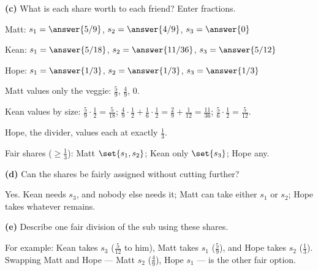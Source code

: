 \documentclass[12pt]{ximera}
\begin{document}
\begin{problem}
\begin{prompt}
\textbf{(c)} What is each share worth to each friend? Enter fractions.

Matt: $s_1=\answer{5/9}$, $s_2=\answer{4/9}$, $s_3=\answer{0}$

\smallskip
Kean: $s_1=\answer{5/18}$, $s_2=\answer{11/36}$, $s_3=\answer{5/12}$

\smallskip
Hope: $s_1=\answer{1/3}$, $s_2=\answer{1/3}$, $s_3=\answer{1/3}$

\begin{feedback}
Matt values only the veggie: $\frac59$, $\frac49$, $0$.

Kean values by size: $\frac59\cdot\frac12=\frac5{18}$;
$\frac49\cdot\frac12+\frac16\cdot\frac12=\frac29+\frac1{12}=\frac{11}{36}$;
$\frac56\cdot\frac12=\frac5{12}$.

Hope, the divider, values each at exactly $\frac13$.

Fair shares ($\ge\frac13$): Matt $\set{s_1,s_2}$; Kean only $\set{s_3}$; Hope any.
\end{feedback}
\end{prompt}

\begin{prompt}
\textbf{(d)} Can the shares be fairly assigned without cutting further?

\begin{multipleChoice}
\end{multipleChoice}

\begin{feedback}
Yes. Kean needs $s_3$, and nobody else needs it; Matt can take either $s_1$ or $s_2$;
Hope takes whatever remains.
\end{feedback}
\end{prompt}

\begin{prompt}
\textbf{(e)} Describe one fair division of the sub using these shares.

\begin{freeResponse}
\end{freeResponse}

\begin{feedback}
For example: Kean takes $s_3$ ($\frac5{12}$ to him), Matt takes $s_1$ ($\frac59$), and
Hope takes $s_2$ ($\frac13$). Swapping Matt and Hope --- Matt $s_2$ ($\frac49$), Hope
$s_1$ --- is the other fair option.
\end{feedback}
\end{prompt}
\end{problem}
\end{document}
